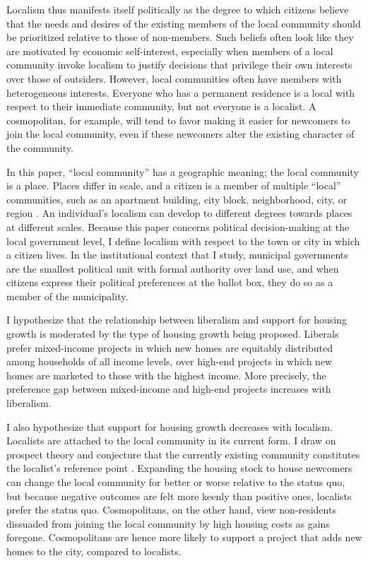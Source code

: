 \documentclass[article,11pt]{memoir}
\begin{document}
Localism thus manifests itself politically as the degree to which citizens believe that the needs and desires of the existing members of the local community should be prioritized relative to those of non-members.  Such beliefs often look like they are motivated by economic self-interest, especially when members of a local community invoke localism to justify decisions that privilege their own interests over those of outsiders.  However, local communities often have members with heterogeneous interests. Everyone who has a permanent residence is a local with respect to their immediate community, but not everyone is a localist. A cosmopolitan, for example, will tend to favor making it easier for newcomers to join the local community, even if these newcomers alter the existing character of the community.

In this paper, ``local community'' has a geographic meaning; the local community is a place.  Places differ in scale, and a citizen is a member of multiple ``local'' communities, such as an apartment building, city block, neighborhood, city, or region \citep{hidalgo_place_2001,lewicka_what_2010}.  An individual's localism can develop to different degrees towards places at different scales.  Because this paper concerns political decision-making at the local government level, I define localism with respect to the town or city in which a citizen lives.  In the institutional context that I study, municipal governments are the smallest political unit with formal authority over land use, and when citizens express their political preferences at the ballot box, they do so as a member of the municipality.

I hypothesize that the relationship between liberalism and support for housing growth is moderated by the type of housing growth being proposed. Liberals prefer mixed-income projects in which new homes are equitably distributed among households of all income levels, over high-end projects in which new homes are marketed to those with the highest income.  More precisely, the preference gap between mixed-income and high-end projects increases with liberalism.

I also hypothesize that support for housing growth decreases with localism. Localists are attached to the local community in its current form. I draw on prospect theory and conjecture that the currently existing community constitutes the localist's reference point \citep{kahneman_prospect_1979}. Expanding the housing stock to house newcomers can change the local community for better or worse relative to the status quo, but because negative outcomes are felt more keenly than positive ones, localists prefer the status quo. Cosmopolitans, on the other hand, view non-residents dissuaded from joining the local community by high housing costs as gains foregone. Cosmopolitans are hence more likely to support a project that adds new homes to the city, compared to localists.
\end{document}
